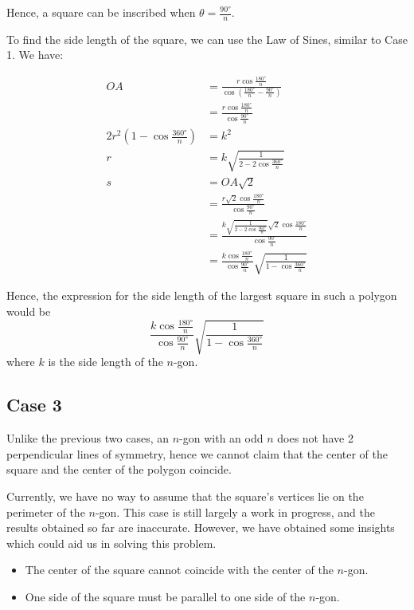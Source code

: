\documentclass[12pt]{scrartcl}
\begin{document}
Hence, a square can be inscribed when $\theta = \frac{\ang{90}}{n}$.

To find the side length of the square, we can use the Law of Sines, similar to Case 1. We have:

\begin{align*}
	OA & = \frac{r \cos \frac{\ang{180}}{n}}{\cos \left(\frac{\ang{180}}{n} - \frac{\ang{90}}{n}\right)}  \\
	& = \frac{r \cos \frac{\ang{180}}{n}}{\cos \frac{\ang{90}}{n}}  \\
	2r^2 \left(1 - \cos \frac{\ang{360}}{n}\right) & = k^2  \\
	r & = k\sqrt{\frac{1}{2 - 2\cos\frac{\ang{360}}{n}}}  \\
	s & = OA\sqrt{2} \\
	& = \frac{r \sqrt{2} \cos \frac{\ang{180}}{n}}{\cos \frac{\ang{90}}{n}}  \\
	& =\frac{k\sqrt{\frac{1}{2 - 2\cos\frac{\ang{360}}{n}}} \sqrt{2} \cos \frac{\ang{180}}{n}}{\cos \frac{\ang{90}}{n}}  \\
	& = \frac{k \cos \frac{\ang{180}}{n}}{\cos \frac{\ang{90}}{n}}\sqrt{\frac{1}{1 - \cos\frac{\ang{360}}{n}}}
\end{align*}

Hence, the expression for the side length of the largest square in such a polygon would be
\begin{equation}
\frac{k \cos \frac{\ang{180}}{n}}{\cos \frac{\ang{90}}{n}}\sqrt{\frac{1}{1 - \cos\frac{\ang{360}}{n}}}
\end{equation}
where $k$ is the side length of the $n$-gon.

\pagebreak

\subsection{Case 3}
Unlike the previous two cases, an $n$-gon with an odd $n$ does not have 2 perpendicular lines of symmetry, hence we cannot claim that the center of the square and the center of the polygon coincide.

Currently, we have no way to assume that the square's vertices lie on the perimeter of the $n$-gon.
This case is still largely a work in progress, and the results obtained so far are inaccurate. However, we have obtained some insights which could aid us in solving this problem.

\begin{itemize}
\item The center of the square cannot coincide with the center of the $n$-gon.
\item One side of the square must be parallel to one side of the $n$-gon.
\end{itemize}
\end{document}
